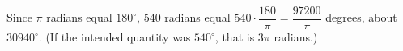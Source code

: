 Since $\pi$ radians equal $180^\circ$, $540$ radians equal $540\cdot\dfrac{180}{\pi}=\boxed{\dfrac{97200}{\pi}}$ degrees, about $30940^\circ$. (If the intended quantity was $540^\circ$, that is $3\pi$ radians.)

